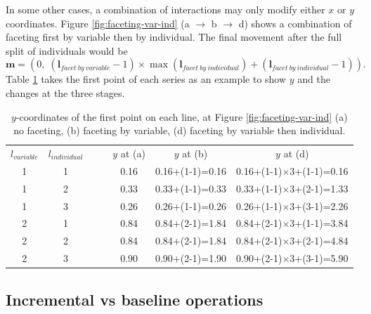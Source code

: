 \documentclass[12pt]{article}
\providecommand{\tabularnewline}{\\}
\begin{document}
In some other cases, a combination of interactions may
only modify either $x$ or $y$ coordinates. Figure
\ref{fig:faceting-var-ind} (a $\rightarrow$ b $\rightarrow$ d)
shows a combination of faceting first by variable then
by individual. The final movement after the full split
of individuals would be
\[
\mathbf{m} = (0, \; (\mathbf{l}{}_{facet~by~variable}-1)\times \max(\mathbf{l}{}_{facet~by~individual})+(\mathbf{l}{}_{facet~by~individual}-1)).
\]
Table \ref{tab:additive-faceting} takes the first point
of each series as an example to show $y$ and the changes
at the three stages.

\begin{table}[h]
\begin{center}
\begin{tabular}{|c|c|cc|c||c||c|}
\cline{1-2} \cline{5-7}
$l_{variable}$ & $l_{individual}$ &  &  & $y$ at (a) & $y$ at (b) & $y$ at (d)\tabularnewline
\cline{1-2} \cline{5-7}
1 & 1 &  &  & 0.16 & 0.16+(1-1)=0.16 & 0.16+(1-1)$\times$3+(1-1)=0.16\tabularnewline
\cline{1-2} \cline{5-7}
1 & 2 &  &  & 0.33 & 0.33+(1-1)=0.33 & 0.33+(1-1)$\times$3+(2-1)=1.33\tabularnewline
\cline{1-2} \cline{5-7}
1 & 3 &  &  & 0.26 & 0.26+(1-1)=0.26 & 0.26+(1-1)$\times$3+(3-1)=2.26\tabularnewline
\cline{1-2} \cline{5-7}
2 & 1 &  &  & 0.84 & 0.84+(2-1)=1.84 & 0.84+(2-1)$\times$3+(1-1)=3.84\tabularnewline
\cline{1-2} \cline{5-7}
2 & 2 &  &  & 0.84 & 0.84+(2-1)=1.84 & 0.84+(2-1)$\times$3+(2-1)=4.84\tabularnewline
\cline{1-2} \cline{5-7}
2 & 3 &  &  & 0.90 & 0.90+(2-1)=1.90 & 0.90+(2-1)$\times$3+(3-1)=5.90\tabularnewline
\cline{1-2} \cline{5-7}
\end{tabular}
\end{center}
\caption{\label{tab:additive-faceting}$y$-coordinates of the
first point on each line, at Figure \ref{fig:faceting-var-ind}
(a) no faceting, (b) faceting by variable, (d) faceting by
variable then individual.}
\end{table}

\subsection{Incremental vs baseline operations\label{sub:Two-procedures}}
\end{document}
